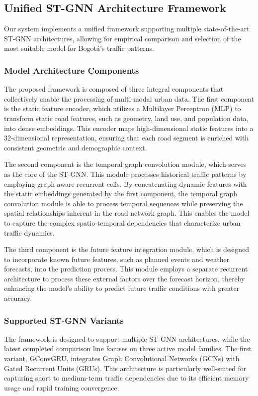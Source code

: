 \documentclass[11pt, a4paper]{article}
\begin{document}
\subsection{Unified ST-GNN Architecture Framework}

Our system implements a unified framework supporting multiple state-of-the-art ST-GNN architectures, allowing for empirical comparison and selection of the most suitable model for Bogotá's traffic patterns.

\subsubsection{Model Architecture Components}
The proposed framework is composed of three integral components that collectively enable the processing of multi-modal urban data. The first component is the static feature encoder, which utilizes a Multilayer Perceptron (MLP) to transform static road features, such as geometry, land use, and population data, into dense embeddings. This encoder maps high-dimensional static features into a 32-dimensional representation, ensuring that each road segment is enriched with consistent geometric and demographic context.

The second component is the temporal graph convolution module, which serves as the core of the ST-GNN. This module processes historical traffic patterns by employing graph-aware recurrent cells. By concatenating dynamic features with the static embeddings generated by the first component, the temporal graph convolution module is able to process temporal sequences while preserving the spatial relationships inherent in the road network graph. This enables the model to capture the complex spatio-temporal dependencies that characterize urban traffic dynamics.

The third component is the future feature integration module, which is designed to incorporate known future features, such as planned events and weather forecasts, into the prediction process. This module employs a separate recurrent architecture to process these external factors over the forecast horizon, thereby enhancing the model's ability to predict future traffic conditions with greater accuracy.

\subsubsection{Supported ST-GNN Variants}
The framework is designed to support multiple ST-GNN architectures, while the latest completed comparison line focuses on three active model families. The first variant, GConvGRU, integrates Graph Convolutional Networks (GCNs) with Gated Recurrent Units (GRUs). This architecture is particularly well-suited for capturing short to medium-term traffic dependencies due to its efficient memory usage and rapid training convergence.
\end{document}
